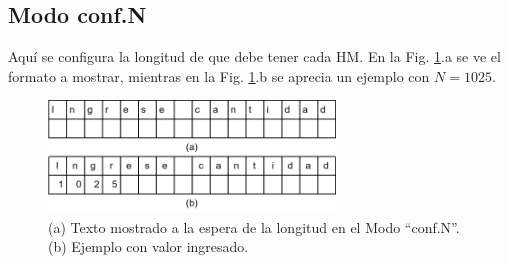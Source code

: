 \documentclass[main_conf.tex]{subfiles}
\begin{document}
\subsection{Modo conf.N}
Aquí se configura la longitud de que debe tener cada HM.
En la Fig. \ref{Modo_Conf_N}.a se ve el formato a mostrar,
mientras en la Fig. \ref{Modo_Conf_N}.b se aprecia un
ejemplo con $N = 1025$.

\begin{figure}[!t]
  \centering
  \includegraphics[width=3.0in]{../img/modo/Conf_N.png}
  \caption{(a) Texto mostrado a la espera de la longitud en el Modo “conf.N”.
           (b) Ejemplo con valor ingresado.
  }
  \label{Modo_Conf_N}
\end{figure}
\end{document}
